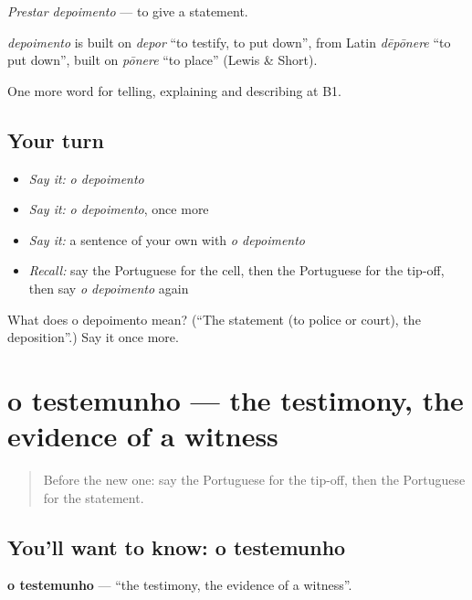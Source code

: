 \emph{Prestar depoimento} — to give a statement.

\begin{cousinweb}
\emph{depoimento} is built on \emph{depor} \textquotedblleft{}to testify, to put down\textquotedblright{}, from Latin \emph{dēpōnere} \textquotedblleft{}to put down\textquotedblright{}, built on \emph{pōnere} \textquotedblleft{}to place\textquotedblright{} (Lewis \& Short).
\end{cousinweb}

\begin{grammarlens}[title={What you've built}]
One more word for telling, explaining and describing at B1.
\end{grammarlens}

\subsection*{Your turn}
\begin{itemize}
\raggedright
  \item \emph{Say it:} \emph{o depoimento}
  \item \emph{Say it:} \emph{o depoimento}, once more
  \item \emph{Say it:} a sentence of your own with \emph{o depoimento}
  \item \emph{Recall:} say the Portuguese for the cell, then the Portuguese for the tip-off, then say \emph{o depoimento} again
\end{itemize}

\begin{tcolorbox}[breakable,colback=teal!4,colframe=teal!35!black,title={Before you move on}]
What does o depoimento mean? (\textquotedblleft{}The statement (to police or court), the deposition\textquotedblright{}.) Say it once more.
\end{tcolorbox}
\section[o testemunho]{o testemunho — the testimony, the evidence of a witness}

\label{lesson:PT-C297-testemunho}



\begin{quote}
Before the new one: say the Portuguese for the tip-off, then the Portuguese for the statement.
\end{quote}

\subsection*{You'll want to know: o testemunho}
\textbf{o testemunho} — \textquotedblleft{}the testimony, the evidence of a witness\textquotedblright{}.

